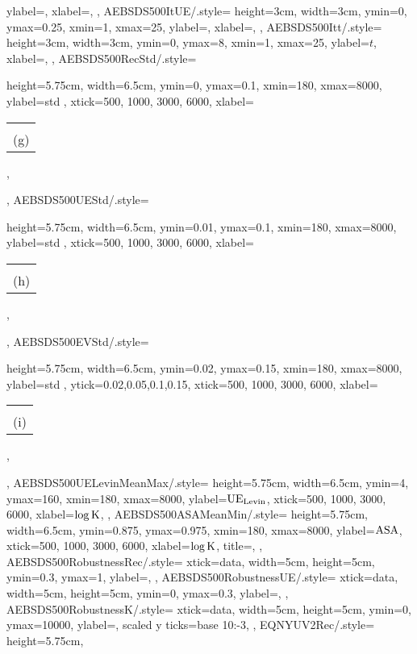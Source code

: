{{        ylabel=\Rec,
        xlabel=\K,
    },
    AEBSDS500ItUE/.style={
    	height=3cm,
        width=3cm,
        ymin=0,
        ymax=0.25,
        xmin=1,
        xmax=25,
        ylabel=\UE,
        xlabel=\K,
    },
    AEBSDS500Itt/.style={
    	height=3cm,
        width=3cm,
        ymin=0,
        ymax=8,
        xmin=1,
        xmax=25,
        ylabel=$t$,
        xlabel=\K,
    },
    AEBSDS500RecStd/.style={
        height=5.75cm,
        width=6.5cm,
        ymin=0,
        ymax=0.1,
        xmin=180,
        xmax=8000,
        ylabel=std \Rec,
        xtick={500, 1000, 3000, 6000},
        xlabel=\begin{tabular}{c}\K\\(g)\end{tabular},
    },
    AEBSDS500UEStd/.style={
        height=5.75cm,
        width=6.5cm,
        ymin=0.01,
        ymax=0.1,
        xmin=180,
        xmax=8000,
        ylabel=std \UE,
        xtick={500, 1000, 3000, 6000},
        xlabel=\begin{tabular}{c}\K\\(h)\end{tabular},
    },
    AEBSDS500EVStd/.style={
        height=5.75cm,
        width=6.5cm,
        ymin=0.02,
        ymax=0.15,
        xmin=180,
        xmax=8000,
        ylabel=std \EV,
        ytick={0.02,0.05,0.1,0.15},
        xtick={500, 1000, 3000, 6000},
        xlabel=\begin{tabular}{c}\K\\(i)\end{tabular},
    },
    AEBSDS500UELevinMeanMax/.style={
        height=5.75cm,
        width=6.5cm,
        ymin=4,
        ymax=160,
        xmin=180,
        xmax=8000,
        ylabel=$\UEL$,
        xtick={500, 1000, 3000, 6000},
        xlabel=$\log\text{K}$,
    },
    AEBSDS500ASAMeanMin/.style={
        height=5.75cm,
        width=6.5cm,
        ymin=0.875,
        ymax=0.975,
        xmin=180,
        xmax=8000,
        ylabel=$\text{ASA}$,
        xtick={500, 1000, 3000, 6000},
        xlabel=$\log\text{K}$,
        title=\BSDS,
    },
    AEBSDS500RobustnessRec/.style={
    	xtick=data,
		width=5cm,
		height=5cm,
		ymin=0.3,
		ymax=1,
        ylabel=\Rec,
    },
    AEBSDS500RobustnessUE/.style={
    	xtick=data,
		width=5cm,
		height=5cm,
		ymin=0,
		ymax=0.3,
        ylabel=\UE,
    },
    AEBSDS500RobustnessK/.style={
    	xtick=data,
		width=5cm,
		height=5cm,
		ymin=0,
		ymax=10000,
        ylabel=\K,
        scaled y ticks={base 10:-3},
    },
    EQNYUV2Rec/.style={
        height=5.75cm,
}}
